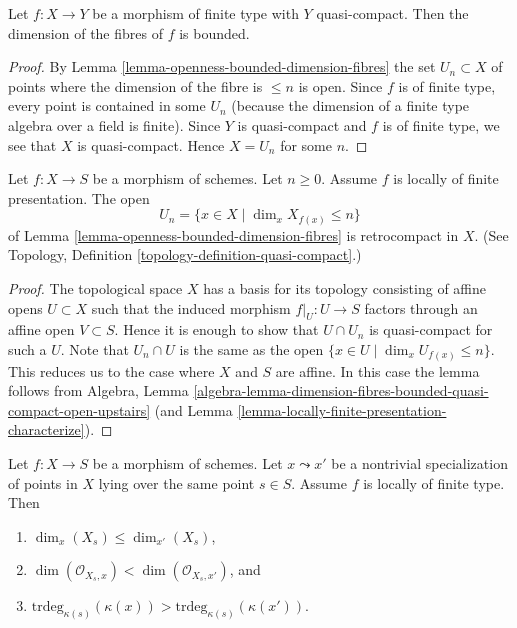 \begin{lemma}
\label{lemma-morphism-finite-type-bounded-dimension}
Let $f : X \to Y$ be a morphism of finite type with $Y$ quasi-compact.
Then the dimension of the fibres of $f$ is bounded.
\end{lemma}

\begin{proof}
By Lemma \ref{lemma-openness-bounded-dimension-fibres}
the set $U_n \subset X$ of points where the dimension of the fibre
is $\leq n$ is open. Since $f$ is of finite type, every point is
contained in some $U_n$ (because the dimension of a finite
type algebra over a field is finite). Since $Y$ is quasi-compact and $f$ is of
finite type, we see that $X$ is quasi-compact. Hence $X = U_n$ for
some $n$.
\end{proof}

\begin{lemma}
\label{lemma-openness-bounded-dimension-fibres-finite-presentation}
Let $f : X \to S$ be a morphism of schemes.
Let $n \geq 0$. Assume $f$ is locally of finite presentation.
The open
$$
U_n = \{x \in X \mid \dim_x X_{f(x)} \leq n\}
$$
of Lemma \ref{lemma-openness-bounded-dimension-fibres} is retrocompact
in $X$. (See Topology, Definition \ref{topology-definition-quasi-compact}.)
\end{lemma}

\begin{proof}
The topological space $X$ has a basis for its topology consisting of
affine opens $U \subset X$ such that the induced morphism
$f|_U : U \to S$ factors through an affine open $V \subset S$. Hence
it is enough to show that $U \cap U_n$ is quasi-compact for such a $U$.
Note that $U_n \cap U$ is the same as the open
$\{x \in U \mid \dim_x U_{f(x)} \leq n\}$. This reduces us to the case
where $X$ and $S$ are affine. In this case the lemma follows from
Algebra,
Lemma \ref{algebra-lemma-dimension-fibres-bounded-quasi-compact-open-upstairs}
(and Lemma \ref{lemma-locally-finite-presentation-characterize}).
\end{proof}

\begin{lemma}
\label{lemma-dimension-fibre-specialization}
Let $f : X \to S$ be a morphism of schemes.
Let $x \leadsto x'$ be a nontrivial specialization of points in $X$
lying over the same point $s \in S$. Assume $f$ is locally of finite type.
Then
\begin{enumerate}
\item $\dim_x(X_s) \leq \dim_{x'}(X_s)$,
\item $\dim(\mathcal{O}_{X_s, x}) < \dim(\mathcal{O}_{X_s, x'})$, and
\item $\text{trdeg}_{\kappa(s)}(\kappa(x)) >
\text{trdeg}_{\kappa(s)}(\kappa(x'))$.
\end{enumerate}
\end{lemma}

